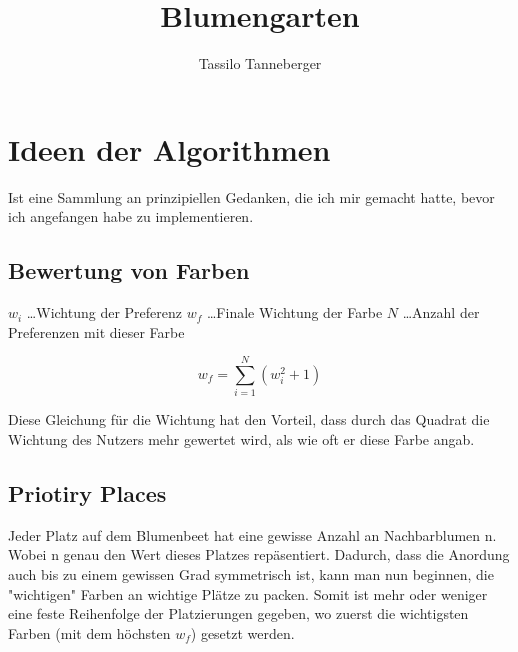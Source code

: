 \documentclass{article}
\begin{document}
\title{Blumengarten}
\author{Tassilo Tanneberger}

\maketitle

\section{Ideen der Algorithmen}
Ist eine Sammlung an prinzipiellen Gedanken, die ich mir gemacht hatte, bevor ich angefangen habe zu implementieren.
\subsection{Bewertung von Farben}
 
\(w_i\) \dots  	Wichtung der Preferenz \newline
\(w_f\) \dots 	Finale Wichtung der Farbe \newline
\(N\) \dots    	Anzahl der Preferenzen mit dieser Farbe

\begin{equation}
w_f =  \sum \limits_{i=1}^N  (w_i^2 + 1)
\end{equation}

Diese Gleichung für die Wichtung hat den Vorteil, dass durch das Quadrat die Wichtung des Nutzers mehr gewertet wird, als wie oft er diese Farbe angab.

\subsection{Priotiry Places}

Jeder Platz auf dem Blumenbeet hat eine gewisse Anzahl an Nachbarblumen n. Wobei n genau den Wert dieses Platzes repäsentiert. Dadurch, dass die Anordung auch bis zu einem gewissen Grad symmetrisch ist, kann  man nun beginnen, die "wichtigen" Farben an wichtige Plätze zu packen. Somit ist mehr oder weniger eine feste Reihenfolge der Platzierungen gegeben, wo zuerst die wichtigsten Farben (mit dem höchsten \(w_f\)) gesetzt werden.
\end{document}
